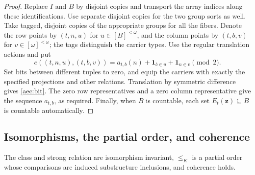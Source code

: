 \begin{proof}
Replace \(I\) and \(B\) by disjoint copies and transport the array
indices along these identifications.  Use separate disjoint copies
for the two group sorts as well.
Take tagged, disjoint copies of the appropriate groups for all
the fibers.  Denote the row points by \((t,n,u)\) for
\(u\in[B]^{<\omega}\), and the column points by \((t,b,v)\)
for \(v\in[\omega]^{<\omega}\); the tags distinguish the
carrier types.  Use the regular translation actions and put
\begin{equation}\label{aec:array-realization}
 e((t,n,u),(t,b,v))
 =
 a_{t,b}(n)+\boldsymbol 1_{b\in u}
           +\boldsymbol 1_{n\in v}\pmod2.
\end{equation}
Set bits between different tuples to zero, and equip the
carriers with exactly the specified projections and other
relations.  Translation by symmetric difference gives
\eqref{aec:bit}.  The zero row representatives and a zero
column representative give the sequence \(a_{t,b}\), as
required.  Finally, when \(B\) is countable, each set
\(E_t(\mathbf z)\subseteq B\) is countable automatically.
\end{proof}

\subsection{Isomorphisms, the partial order, and coherence}

\begin{lemma}\label{aec:order-coherence}
The class and strong relation are isomorphism invariant,
\(\le_K\) is a partial order whose comparisons are induced
substructure inclusions, and coherence holds.
\end{lemma}

